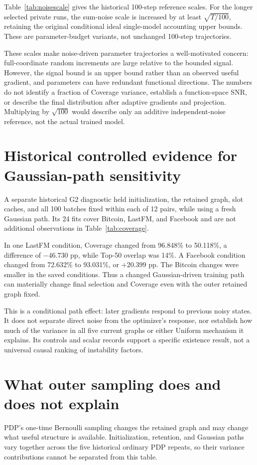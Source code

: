 Table~\ref{tab:noisescale} gives the historical 100-step reference scales. For the longer selected private runs, the sum-noise scale is increased by at least $\sqrt{T/100}$, retaining the original conditional ideal single-model accounting upper bounds. These are parameter-budget variants, not unchanged 100-step trajectories.

These scales make noise-driven parameter trajectories a well-motivated concern: full-coordinate random increments are large relative to the bounded signal. However, the signal bound is an upper bound rather than an observed useful gradient, and parameters can have redundant functional directions. The numbers do not identify a fraction of Coverage variance, establish a function-space SNR, or describe the final distribution after adaptive gradients and projection. Multiplying by $\sqrt{100}$ would describe only an additive independent-noise reference, not the actual trained model.

\section{Historical controlled evidence for Gaussian-path sensitivity}
A separate historical G2 diagnostic held initialization, the retained graph, slot caches, and all 100 batches fixed within each of 12 pairs, while using a fresh Gaussian path. Its 24 fits cover Bitcoin, LastFM, and Facebook and are not additional observations in Table~\ref{tab:coverage}.

In one LastFM condition, Coverage changed from 96.848\% to 50.118\%, a difference of $-46.730$ pp, while Top-50 overlap was 14\%. A Facebook condition changed from 72.632\% to 93.031\%, or $+20.399$ pp. The Bitcoin changes were smaller in the saved conditions. Thus a changed Gaussian-driven training path can materially change final selection and Coverage even with the outer retained graph fixed.

This is a conditional path effect: later gradients respond to previous noisy states. It does not separate direct noise from the optimizer's response, nor establish how much of the variance in all five current graphs or either Uniform mechanism it explains. Its controls and scalar records support a specific existence result, not a universal causal ranking of instability factors.

\section{What outer sampling does and does not explain}
PDP's one-time Bernoulli sampling changes the retained graph and may change what useful structure is available. Initialization, retention, and Gaussian paths vary together across the five historical ordinary PDP repeats, so their variance contributions cannot be separated from this table.

